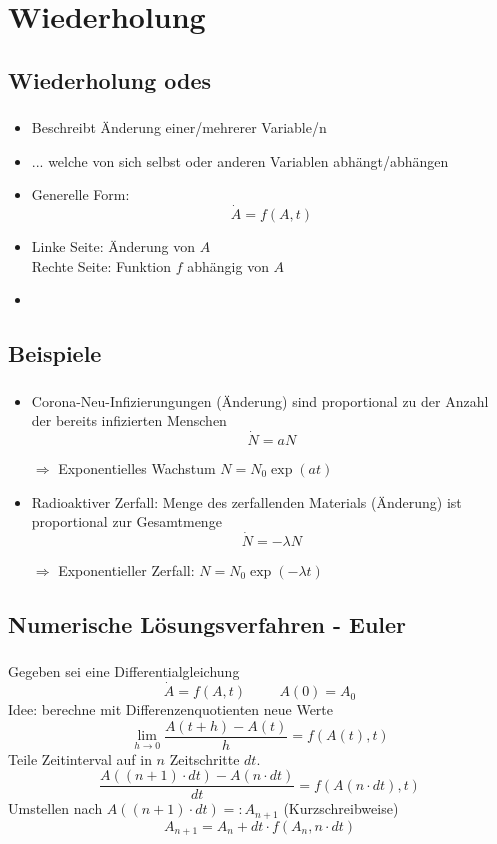 \section{Wiederholung}
\label{sec:recap}


\subsection{Wiederholung \acsp{ode}}
\label{subsec:basic-concepts}
\begin{frame}
    \frametitle{\insertsubsection}
    \begin{itemize}[<+->]
        \item Beschreibt Änderung einer/mehrerer Variable/n
        \item ... welche von sich selbst oder anderen Variablen abhängt/abhängen
        \item Generelle Form:
        \[\dot{A} = f(A, t)\]
        \item Linke Seite: Änderung von $A$\\Rechte Seite: Funktion $f$ abhängig von $A$
        \item 
    \end{itemize}
\end{frame}


\subsection{Beispiele}
\label{subsec:examples}
\begin{frame}
    \frametitle{\insertsubsection}
    \begin{itemize}[<+->]
        \item Corona-Neu-Infizierungungen (Änderung) sind proportional zu der Anzahl der bereits infizierten Menschen
        \[\dot{N} = a N\]
        \item[$\Rightarrow$] Exponentielles Wachstum $N=N_0\exp(at)$
        \item Radioaktiver Zerfall: Menge des zerfallenden Materials (Änderung) ist proportional zur Gesamtmenge
        \[\dot{N} = -\lambda N\]
        \item[$\Rightarrow$] Exponentieller Zerfall: $N=N_0\exp(-\lambda t)$
    \end{itemize}
\end{frame}


\subsection{Numerische Lösungsverfahren - Euler}
\label{subsec:numerical-methods}
\begin{frame}
    \frametitle{\insertsubsection}
    Gegeben sei eine Differentialgleichung
    \[\dot{A} = f(A, t) \hspace{1cm} A(0) = A_0\]
    Idee: berechne mit Differenzenquotienten neue Werte
    \[\lim\limits_{h\rightarrow0}\frac{A(t + h) - A(t)}{h} = f(A(t), t)\]
    Teile Zeitinterval auf in $n$ Zeitschritte $dt$.
    \[\frac{A((n+1)\cdot dt) - A(n\cdot dt)}{dt} = f(A(n\cdot dt), t)\]
    Umstellen nach $A((n+1)\cdot dt)=:A_{n+1}$ (Kurzschreibweise)
    \[A_{n+1} = A_n + dt\cdot f(A_n, n\cdot dt)\]
\end{frame}


